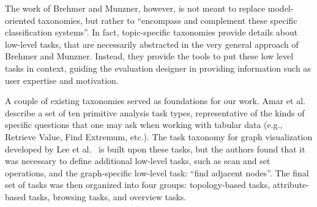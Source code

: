 \documentclass{article}
\begin{document}
The work of Brehmer and Munzner, however, is not meant to replace model-oriented taxonomies, but rather to ``encompass and complement these specific classification systems''. In fact, topic-specific taxonomies provide details about low-level tasks, that are necessarily abstracted in the very general approach of Brehmer and Munzner. Instead, they provide the tools to put these low level tasks in context, guiding the evaluation designer in providing information 
such as user expertise and motivation. 


A couple of existing taxonomies served as foundations for our work. Amar et al.~\cite{IV_RA1} describe a set of ten primitive analysis task types, representative of the kinds of specific questions that one may ask when working with tabular data (e.g., Retrieve Value, Find Extremum, etc.).  The task taxonomy for graph visualization developed by Lee et al.~\cite{IV_BL} is built upon these tasks, but the authors found that it was necessary to define additional low-level tasks, such as scan and set operations, and the graph-specific low-level task: ``find adjacent nodes''. The final set of tasks was then organized into four groups: topology-based tasks, attribute-based tasks, browsing tasks, and overview tasks.
\end{document}
